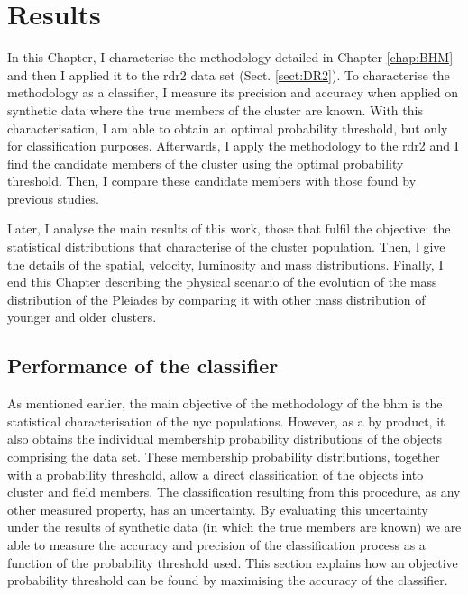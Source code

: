 \chapter{Results}
\label{chap:Results}
In this Chapter, I characterise the methodology detailed in Chapter  \ref{chap:BHM} and then I applied it to the \gls{rdr2} data set (Sect. \ref{sect:DR2}). To characterise the methodology as a classifier, I measure its precision and accuracy when applied on synthetic data where the true members of the cluster are known. With this characterisation, I am able to obtain an optimal probability threshold, but only for classification purposes. Afterwards, I apply the methodology to the \gls{rdr2} and I find the candidate members of the cluster using the optimal probability threshold. Then, I compare these candidate members with those found by previous studies.

Later, I analyse the main results of this work, those that fulfil the objective: the statistical distributions that characterise of the cluster population. Then, l give the details of the spatial, velocity, luminosity and mass distributions. Finally, I end this Chapter describing the physical scenario of the evolution of the mass distribution of the Pleiades by comparing it with other mass distribution of younger and older clusters.

\section{Performance of the classifier}
\label{sect:classifier}
As mentioned earlier, the main objective of the methodology of the \gls{bhm} is the statistical characterisation of the \gls{nyc} populations. However, as a by product, it also obtains the individual membership probability distributions of the objects comprising the data set. These membership probability distributions, together with a probability threshold, allow a direct classification of the objects into cluster and field members.  The classification resulting from this procedure, as any other measured property, has an uncertainty. By evaluating this uncertainty under the results of synthetic data (in which the true members are known) we are able to measure the accuracy and precision of the classification process as a function of the probability threshold used. This section explains how an objective probability threshold can be found by maximising the accuracy of the classifier. 

